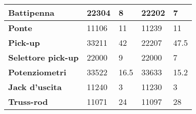 \begin{table}[htbp]
{\begin{tabular}{|l|l|l|l|l|}
\textbf{Battipenna}        & 22304                       & 8                 & 22202                       & 7                 \\ \hline
\textbf{Ponte}             & 11106                       & 11                 & 11239                       & 11                 \\ \hline
\textbf{Pick-up}           & 33211                       & 42                 & 22207                       & 47.5                 \\ \hline
\textbf{Selettore pick-up} & 22000                       & 9                 & 22000                       & 7                 \\ \hline
\textbf{Potenziometri}     & 33522                       & 16.5                 & 33633                       & 15.2                 \\ \hline
\textbf{Jack d'uscita}     & 11240                       & 3                 & 11230                       & 3                 \\ \hline
\textbf{Truss-rod}         & 11071                       & 24                 & 11097                       & 28                 \\ \hline
\end{tabular}}
\end{table}

